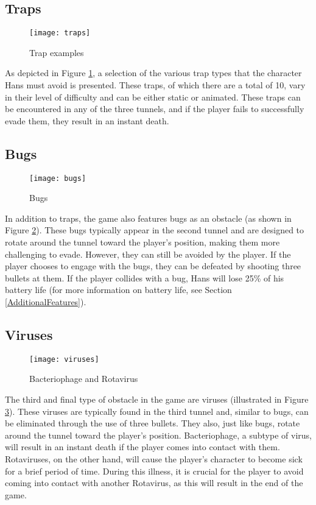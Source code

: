 \subsection{Traps}
\begin{figure}[h]
    \centering
    \texttt{[image: traps]}
    \caption{Trap examples}
    \label{fig:traps}
\end{figure}
As depicted in Figure \ref{fig:traps}, a selection of the various trap types that the character Hans must avoid is presented. These traps, of which there are a total of 10, vary in their level of difficulty and can be either static or animated. These traps can be encountered in any of the three tunnels, and if the player fails to successfully evade them, they result in an instant death.

\subsection{Bugs}
\label{Bugs}
\begin{figure}[h]
    \centering
    \texttt{[image: bugs]}
    \caption{Bugs}
    \label{fig:bugs}
\end{figure}
In addition to traps, the game also features bugs as an obstacle (as shown in Figure \ref{fig:bugs}). These bugs typically appear in the second tunnel and are designed to rotate around the tunnel toward the player's position, making them more challenging to evade. However, they can still be avoided by the player. If the player chooses to engage with the bugs, they can be defeated by shooting three bullets at them. If the player collides with a bug, Hans will lose 25\% of his battery life (for more information on battery life, see Section \ref{AdditionalFeatures}).

\subsection{Viruses}
\begin{figure}[h]
    \centering
    \texttt{[image: viruses]}
    \caption{Bacteriophage and Rotavirus}
    \label{fig:viruses}
\end{figure}

The third and final type of obstacle in the game are viruses (illustrated in Figure \ref{fig:viruses}). These viruses are typically found in the third tunnel and, similar to bugs, can be eliminated through the use of three bullets. They also, just like bugs, rotate around the tunnel toward the player's position. Bacteriophage, a subtype of virus, will result in an instant death if the player comes into contact with them. Rotaviruses, on the other hand, will cause the player's character to become sick for a brief period of time. During this illness, it is crucial for the player to avoid coming into contact with another Rotavirus, as this will result in the end of the game.

